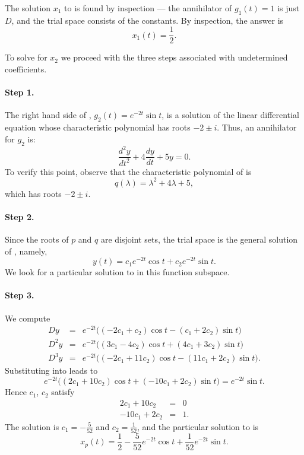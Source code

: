 \documentclass{ximera}
\begin{document}
The solution $x_1$ to  is found by inspection --- the 
annihilator of $g_1(t)=1$ is just $D$, 
and the trial space consists of 
the constants.  By inspection, the answer is 
\[
x_1(t) = \frac{1}{2}.
\]

To solve  for $x_2$ we proceed with the three steps 
associated with undetermined coefficients.

\paragraph{Step 1.} The right hand side of , 
$g_2(t)=e^{-2t}\sin t$, is a solution of the linear differential equation 
whose characteristic polynomial has roots $-2\pm i$.  Thus, an 
annihilator for $g_2$ is:
\begin{equation}  \label{eq:undetcoeffex2}
\frac{d^2y}{dt^2} +4\frac{dy}{dt} +5y = 0.
\end{equation}
To verify this point, observe that the characteristic 
polynomial of  
 is
\[
q(\lambda) = \lambda^2 + 4\lambda +5,
\]
which has roots $-2\pm i$.  

\paragraph{Step 2.} Since the roots of $p$ and $q$ are disjoint sets, the 
trial space is the general solution of 
, namely,  
\[
y(t) = c_1e^{-2t}\cos t + c_2 e^{-2t}\sin t.
\]
We look for a particular solution to  in this function 
subspace.

\paragraph{Step 3.} We compute
\begin{eqnarray*}
Dy   & = & e^{-2t}\Big((-2c_1+  c_2)\cos t - (  c_1+2c_2)\sin t\Big)\\
D^2y & = & e^{-2t}\Big(( 3c_1- 4c_2)\cos t + ( 4c_1+3c_2)\sin t\Big)\\
D^3y & = & e^{-2t}\Big((-2c_1+11c_2)\cos t - (11c_1+2c_2)\sin t\Big).
\end{eqnarray*}
Substituting into  leads to 
\[
e^{-2t}\Big( (2c_1+10c_2)\cos t +(-10c_1+2c_2)\sin t\Big) = 
e^{-2t}\sin t.
\]
Hence $c_1$, $c_2$ satisfy
\begin{eqnarray*}
  2c_1 +10c_2 & = & 0\\
-10c_1 + 2c_2 & = & 1.
\end{eqnarray*}
The solution is $c_1=-\frac{5}{52}$ and $c_2=\frac{1}{52}$, and
the particular solution to  
is
\[
x_p(t) = \frac{1}{2} - \frac{5}{52}e^{-2t}\cos t + \frac{1}{52}e^{-2t}\sin t.
\]
\end{document}
